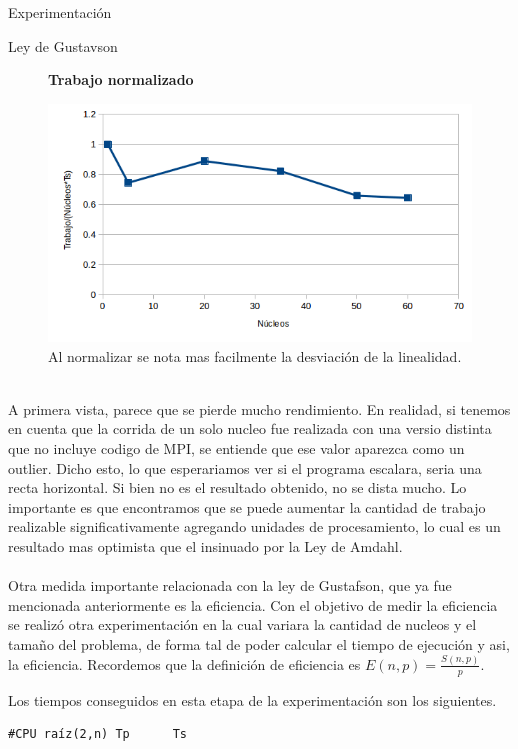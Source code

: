 \begin{section}{Experimentación}
\begin{subsection}{Ley de Gustavson}
\begin{figure}
\textbf{Trabajo normalizado}

\includegraphics[width=\textwidth/2,height=\textheight/2,keepaspectratio]{figures/exp_gustafson_work_norm}
\caption{Al normalizar se nota mas facilmente la desviación de la linealidad.}
\label{fig:exp_gustafson_work_norm}

\end{figure}



~\\

 A primera vista, parece que se pierde mucho rendimiento. En realidad, si tenemos en cuenta que la corrida de un solo nucleo fue realizada con una versio distinta que no incluye codigo de MPI, se entiende que ese valor aparezca como un outlier. Dicho esto, lo que esperariamos ver si el programa escalara, seria una recta horizontal. Si bien no es el resultado obtenido, no se dista mucho. Lo importante es que encontramos que se puede aumentar la cantidad de trabajo realizable significativamente agregando unidades de procesamiento, lo cual es un resultado mas optimista que el insinuado por la Ley de Amdahl.
~\\
~\\
Otra medida importante relacionada con la ley de Gustafson, que ya fue mencionada anteriormente es la eficiencia. Con el objetivo de medir la eficiencia se realizó otra experimentación en la cual variara la cantidad de nucleos y el tamaño del problema, de forma tal de poder calcular el tiempo de ejecución y asi, la eficiencia. Recordemos que la definición de eficiencia es  $E(n,p) = \frac{S(n,p)}{p}$.
~\\
\begin{minipage}{\linewidth}
Los tiempos conseguidos en esta etapa de la experimentación son los siguientes.
~\\
\begin{tcolorbox}[colback=blue!5!white,colframe=blue!75!black,title=Tiempos]
\begin{verbatim}
#CPU raíz(2,n) Tp      Ts 


\end{verbatim}
\end{tcolorbox}
\end{minipage}
\end{subsection}
\end{section}
